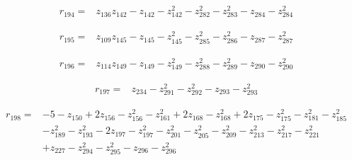 \par\noindent\begin{minipage}{\linewidth}
\begin{align*}
r_{194}={}&z_{136}z_{142}-z_{142}-z_{142}^{2}-z_{282}^{2}-z_{283}^{2}-z_{284}-z_{284}^{2}
\end{align*}
\end{minipage}\par
\par\noindent\begin{minipage}{\linewidth}
\begin{align*}
r_{195}={}&z_{109}z_{145}-z_{145}-z_{145}^{2}-z_{285}^{2}-z_{286}^{2}-z_{287}-z_{287}^{2}
\end{align*}
\end{minipage}\par
\par\noindent\begin{minipage}{\linewidth}
\begin{align*}
r_{196}={}&z_{114}z_{149}-z_{149}-z_{149}^{2}-z_{288}^{2}-z_{289}^{2}-z_{290}-z_{290}^{2}
\end{align*}
\end{minipage}\par
\par\noindent\begin{minipage}{\linewidth}
\begin{align*}
r_{197}={}&z_{234}-z_{291}^{2}-z_{292}^{2}-z_{293}-z_{293}^{2}
\end{align*}
\end{minipage}\par
\par\noindent\begin{minipage}{\linewidth}
\begin{align*}
r_{198}={}&-5-z_{150}+2z_{156}-z_{156}^{2}-z_{161}^{2}+2z_{168}-z_{168}^{2}+2z_{175}-z_{175}^{2}-z_{181}^{2}-z_{185}^{2}\\[-2pt]
&-z_{189}^{2}-z_{193}^{2}-2z_{197}-z_{197}^{2}-z_{201}^{2}-z_{205}^{2}-z_{209}^{2}-z_{213}^{2}-z_{217}^{2}-z_{221}^{2}\\[-2pt]
&+z_{227}-z_{294}^{2}-z_{295}^{2}-z_{296}-z_{296}^{2}
\end{align*}
\end{minipage}\par
